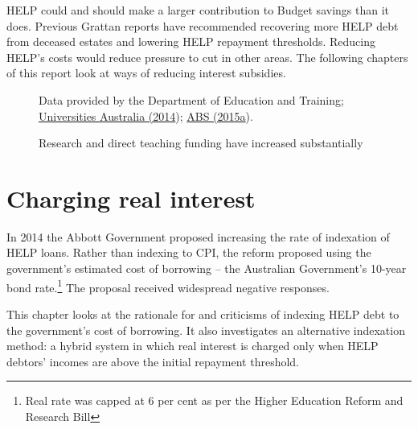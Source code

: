 \documentclass[embargoed]{grattan}
\begin{document}
HELP could and should make a larger contribution to Budget savings than it does. Previous Grattan reports have recommended recovering more HELP debt from deceased estates and lowering HELP repayment thresholds. Reducing HELP's costs would reduce pressure to cut in other areas. The following chapters of this report look at ways of reducing interest subsidies.

\begin{figure}
\caption{Research and direct teaching funding have increased substantially\label{fig:fig12-research-direct-teaching-funding-have-increased-substantially}}



{Data provided by the Department of Education and Training; \protect\hyperlink{_ENREF_78}{Universities Australia (2014}); \protect\hyperlink{_ENREF_2}{ABS (2015a}).}
\end{figure}


\chapter{Charging real interest}\label{chap:charging-real-interest}

In 2014 the Abbott Government proposed increasing the rate of indexation of HELP loans. Rather than indexing to CPI, the reform proposed using the government's estimated cost of borrowing -- the Australian Government's 10-year bond rate.\footnote{Real rate was capped at 6 per cent as per the Higher Education Reform and Research Bill} The proposal received widespread negative responses.

This chapter looks at the rationale for and criticisms of indexing HELP debt to the government's cost of borrowing. It also investigates an alternative indexation method: a hybrid system in which real interest is charged only when HELP debtors' incomes are above the initial repayment threshold.
\end{document}
